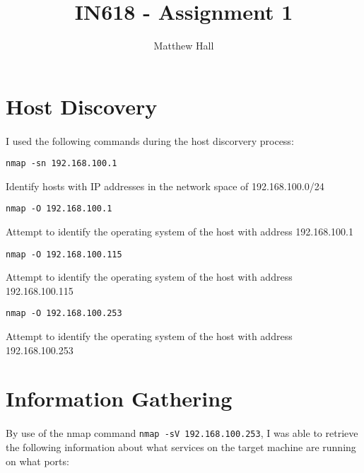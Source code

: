 \documentclass{article}
\title{IN618 - Assignment 1}
\author{Matthew Hall}
\date{}
\begin{document}
\maketitle
\newpage
{}

\tableofcontents
\newpage

\section{Host Discovery}
\paragraph{}
I used the following commands during the host discorvery process:

\texttt{nmap -sn 192.168.100.1}

Identify hosts with IP addresses in the network space of 192.168.100.0/24

\texttt{nmap -O 192.168.100.1}

Attempt to identify the operating system of the host with address 192.168.100.1

\texttt{nmap -O 192.168.100.115}

Attempt to identify the operating system of the host with address 192.168.100.115

\texttt{nmap -O 192.168.100.253}

Attempt to identify the operating system of the host with address 192.168.100.253

\newpage

\section{Information Gathering}
\paragraph{}
By use of the nmap command \texttt{nmap -sV 192.168.100.253}, I was able to retrieve the following information about what services on the target machine are running on what ports:
\newline
\newline
\end{document}

